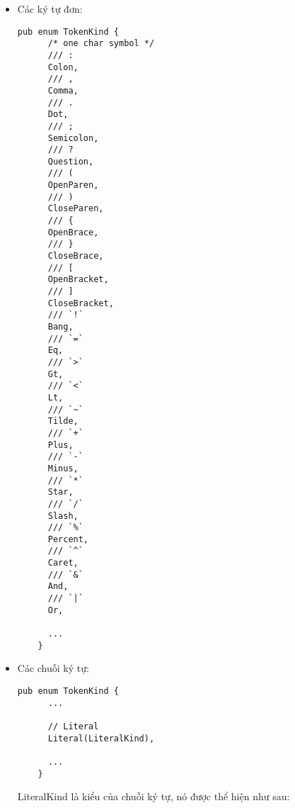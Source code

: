 \begin{itemize}
  \item Các ký tự đơn: 
  \begin{lstlisting}[]
    pub enum TokenKind {
      /* one char symbol */
      /// :
      Colon,
      /// ,
      Comma,
      /// .
      Dot,
      /// ;
      Semicolon,
      /// ?
      Question,
      /// (
      OpenParen,
      /// )
      CloseParen,
      /// {
      OpenBrace,
      /// }
      CloseBrace,
      /// [
      OpenBracket,
      /// ]
      CloseBracket,
      /// `!`
      Bang,
      /// `=`
      Eq,
      /// `>`
      Gt,
      /// `<`
      Lt,
      /// `~`
      Tilde,
      /// `+`
      Plus,
      /// `-`
      Minus,
      /// `*`
      Star,
      /// `/`
      Slash,
      /// `%`
      Percent,
      /// `^`
      Caret,
      /// `&`
      And,
      /// `|`
      Or,

      ...
    }
  \end{lstlisting}
  \item Các chuỗi ký tự:
  \begin{lstlisting}[]
    pub enum TokenKind {
      ...
  
      // Literal
      Literal(LiteralKind),
  
      ...
    }
  \end{lstlisting}

    LiteralKind là kiểu của chuỗi ký tự, nó được thể hiện như sau:


\end{itemize}
